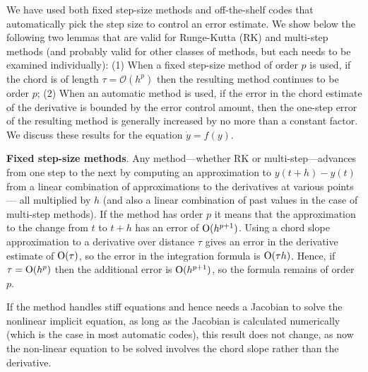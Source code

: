 \documentclass[numbers]{frontiersSCNS}
\DeclareRobustCommand{\inTstep}{\tau}
\DeclareRobustCommand{\outTstep}{h}
\begin{document}
We have used both fixed step-size methods and off-the-shelf codes that 
automatically pick the step size to control an error estimate.
%
We show below the following two lemmas that are valid for Runge-Kutta (RK)
and multi-step methods (and probably valid for other classes of methods,
but each needs to be examined individually):
    (1) When a fixed step-size method of order $p$ is used,
    if the chord is of length ${\inTstep} = \mathcal O({\outTstep}^p)$
    then the resulting method continues to be order $p$;
    (2) When an automatic method is used, if the error in the chord estimate
    of the derivative is bounded by the error control amount, 
    then the one-step error of the resulting method is generally increased
    by no more than a constant factor.
%
%
%
%
We discuss these results for the equation $\dot y = f(y)$.

\textbf{Fixed step-size methods}.  Any method---whether RK or multi-step---advances from one step to the next
by computing an approximation to $y(t+{\outTstep}) - y(t)$ from a linear combination 
of approximations to the derivatives at various points---%
all multiplied by ${\outTstep}$ (and also a linear combination of past values in the case of multi-step methods). 
%
If the method has order $p$ it means that the approximation to the change
from $t$ to $t+{\outTstep}$ has an error of ${\rm O}({\outTstep}^{p+1})$.  
%
Using a chord slope approximation to a derivative over distance ${\inTstep}$ 
gives an error in the derivative estimate of ${\rm O}({\inTstep})$, 
so the error in the integration formula is ${\rm O}({\inTstep}{\outTstep})$.  
%
Hence, if ${\inTstep} = {\rm O}({\outTstep}^p)$ then the additional error is ${\rm O}({\outTstep}^{p+1})$,
so the formula remains of order $p$.

If the method handles stiff equations and hence needs a Jacobian 
to solve the nonlinear implicit equation, as long as the Jacobian is calculated numerically 
(which is the case in most automatic codes), this result does not change, 
as now the non-linear equation to be solved involves the chord slope 
rather than the derivative.
\end{document}
